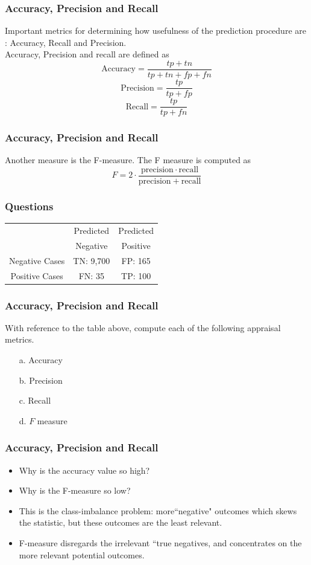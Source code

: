 \documentclass[a4]{beamer}
\begin{document}
\begin{frame}
\frametitle{Accuracy, Precision and Recall}
Important metrics for determining how usefulness of the prediction procedure are : Accuracy, Recall and Precision.
\\
Accuracy, Precision and recall are defined as
\[\mbox{Accuracy}=\frac{tp+tn}{tp+tn+fp+fn} \]
\[\mbox{Precision}=\frac{tp}{tp+fp} \] 
\[\mbox{Recall}=\frac{tp}{tp+fn} \]
\end{frame}
\begin{frame}
\frametitle{Accuracy, Precision and Recall}
Another measure is the F-measure.
The F measure is computed as
\[F = 2 \cdot \frac{\mathrm{precision} \cdot \mathrm{recall}}{ \mathrm{precision} + \mathrm{recall}}\]

\end{frame}
\begin{frame}
\frametitle{Questions}
\begin{center}
\begin{tabular}{|c|c|c|}
\hline
& Predicted  & Predicted \\
 & Negative & Positive \\ \hline
Negative Cases & TN: 9,700  & FP: 165 \\ \hline
Positive Cases & FN: 35 & TP: 100 \\ \hline
\end{tabular} 
\end{center}
\end{frame}
\begin{frame}
\frametitle{Accuracy, Precision and Recall}

With reference to the table above, compute each of the following appraisal metrics.
\begin{multicols}{2} 
\begin{itemize}
    \item[a.] Accuracy
    \item[b.] Precision
    \item[c.] Recall
    \item[d.] $F$ measure
    \end{itemize}
\end{multicols}
\end{frame}
\begin{frame}
\frametitle{Accuracy, Precision and Recall}
\begin{itemize}
\item Why is the accuracy value so high?
\item Why is the F-measure so low?
\item This is the class-imbalance problem: more``negative" outcomes which skews the statistic, but these outcomes are the least relevant.
\item F-measure disregards the irrelevant ``true negatives, and concentrates on the more relevant potential outcomes.
\end{itemize}

\end{frame}
\end{document}
